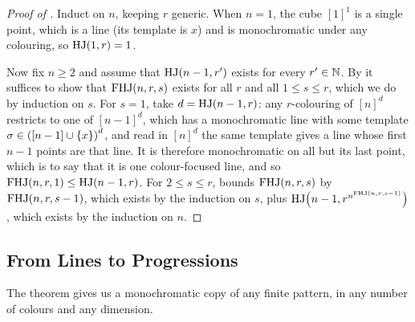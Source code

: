 \begin{proof}[Proof of ]
    Induct on $n$, keeping $r$ generic. When $n = 1$, the cube $[1]^1$ is a single point, which is a line (its template is $x$) and is monochromatic under any colouring, so $\operatorname{HJ}(1, r) = 1$.

    Now fix $n \geq 2$ and assume that $\operatorname{HJ}(n - 1, r')$ exists for every $r' \in \mathbb{N}$. By  it suffices to show that $\operatorname{FHJ}(n, r, s)$ exists for all $r$ and all $1 \leq s \leq r$, which we do by induction on $s$. For $s = 1$, take $d = \operatorname{HJ}(n - 1, r)$: any $r$-colouring of $[n]^d$ restricts to one of $[n - 1]^d$, which has a monochromatic line with some template $\sigma \in \left( [n - 1] \cup \left\{ x \right\} \right)^d$, and read in $[n]^d$ the same template gives a line whose first $n - 1$ points are that line. It is therefore monochromatic on all but its last point, which is to say that it is one colour-focused line, and so $\operatorname{FHJ}(n, r, 1) \leq \operatorname{HJ}(n - 1, r)$. For $2 \leq s \leq r$,  bounds $\operatorname{FHJ}(n, r, s)$ by $\operatorname{FHJ}(n, r, s - 1)$, which exists by the induction on $s$, plus $\operatorname{HJ}\!\left( n - 1, r^{n^{\operatorname{FHJ}(n, r, s - 1)}} \right)$, which exists by the induction on $n$.
\end{proof}

\subsection{From Lines to Progressions}

The theorem gives us a monochromatic copy of any finite pattern, in any number of colours and any dimension.

